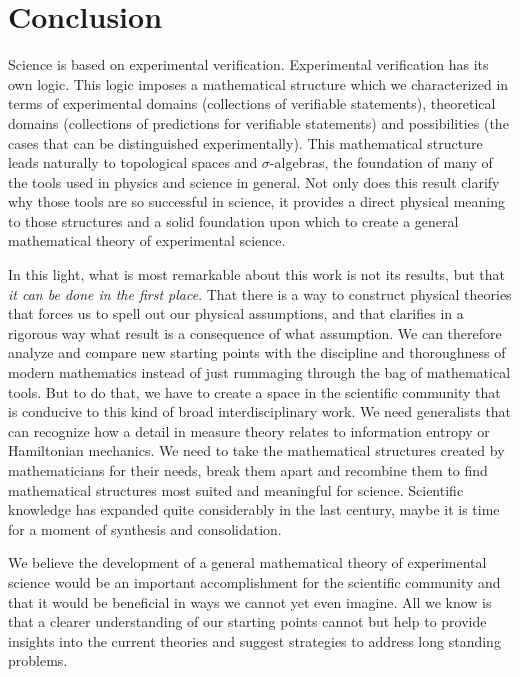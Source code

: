 \documentclass[twocolumn]{article}
\begin{document}
\section{Conclusion}

Science is based on experimental verification. Experimental verification has its own logic. This logic imposes a mathematical structure which we characterized in terms of experimental domains (collections of verifiable statements), theoretical domains (collections of predictions for verifiable statements) and possibilities (the cases that can be distinguished experimentally). This mathematical structure leads naturally to topological spaces and $\sigma$-algebras, the foundation of many of the tools used in physics and science in general. Not only does this result clarify why those tools are so successful in science, it provides a direct physical meaning to those structures and a solid foundation upon which to create a general mathematical theory of experimental science.

In this light, what is most remarkable about this work is not its results, but that \emph{it can be done in the first place}. That there is a way to construct physical theories that forces us to spell out our physical assumptions, and that clarifies in a rigorous way what result is a consequence of what assumption. We can therefore analyze and compare new starting points with the discipline and thoroughness of modern mathematics instead of just rummaging through the bag of mathematical tools. But to do that, we have to create a space in the scientific community that is conducive to this kind of broad interdisciplinary work. We need generalists that can recognize how a detail in measure theory relates to information entropy or Hamiltonian mechanics. We need to take the mathematical structures created by mathematicians for their needs, break them apart and recombine them to find mathematical structures most suited and meaningful for science. Scientific knowledge has expanded quite considerably in the last century, maybe it is time for a moment of synthesis and consolidation.

We believe the development of a general mathematical theory of experimental science would be an important accomplishment for the scientific community and that it would be beneficial in ways we cannot yet even imagine. All we know is that a clearer understanding of our starting points cannot but help to provide insights into the current theories and suggest strategies to address long standing problems.
\end{document}
